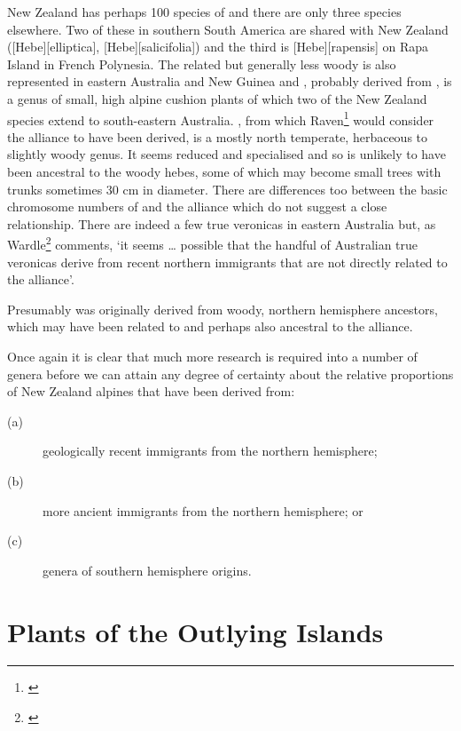 New Zealand has perhaps 100 species of  and there are only three species elsewhere.
Two of these in southern South America are shared with New Zealand ([Hebe][elliptica], [Hebe][salicifolia]) and the third is [Hebe][rapensis] on Rapa Island in French Polynesia.
The related but generally less woody  is also represented in eastern Australia and New Guinea and , probably derived from , is a genus of small, high alpine cushion plants of which two of the New Zealand species extend to south-eastern Australia. , from which Raven\footnote{\cite{raven1973evolution}} would consider the  alliance to have been derived, is a mostly north temperate, herbaceous to slightly woody genus.
It seems reduced and specialised and so is unlikely to have been ancestral to the woody hebes, some of which may become small trees with trunks sometimes 30 cm in diameter.
There are differences too between the basic chromosome numbers of  and the  alliance which do not suggest a close relationship.
There are indeed a few true veronicas in eastern Australia but, as Wardle\footnote{\cite{wardle1978origin}} comments, `it seems … possible that the handful of Australian true veronicas derive from recent northern immigrants that are not directly related to the  alliance'.

Presumably  was originally derived from woody, northern hemisphere ancestors, which may have been related to and perhaps also ancestral to the  alliance.

Once again it is clear that much more research is required into a number of genera before we can attain any degree of certainty about the relative proportions of New Zealand alpines that have been derived from:

\begin{description}
\item[{(a)}]geologically recent immigrants from the northern hemisphere;
\item[{(b)}]more ancient immigrants from the northern hemisphere; or
\item[{(c)}]genera of southern hemisphere origins.
\end{description}

\chapter{Plants of the Outlying Islands}

